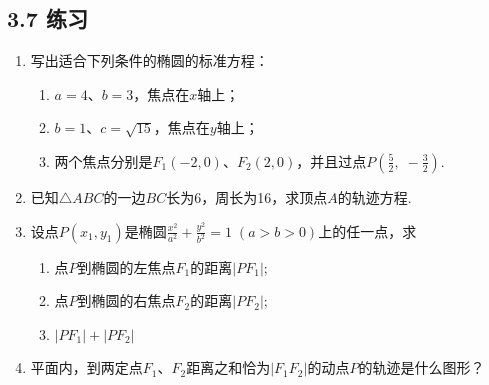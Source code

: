 \subsection*{3.7 练习}
\begin{enumerate}
    \item 写出适合下列条件的椭圆的标准方程：
\begin{enumerate}[(1)]
\item $a=4$、$b=3$，焦点在$x$轴上；
\item $b=1$、$c=\sqrt{15}$，焦点在$y$轴上；
\item 两个焦点分别是$F_1(-2,0)$、$F_2(2,0)$，并且过点$P\left(\frac{5}{2},\; -\frac{3}{2}\right)$.
\end{enumerate}

\item 已知$\triangle ABC$的一边$BC$长为6，周长为16，求顶点$A$的轨迹方程.
\item 设点$P(x_1,y_1)$是椭圆$\frac{x^2}{a^2}+\frac{y^2}{b^2}=1\; (a>b>0)$上的任一点，求
\begin{enumerate}[(1)]
\item 点$P$到椭圆的左焦点$F_1$的距离$|PF_1|$;
\item 点$P$到椭圆的右焦点$F_2$的距离$|PF_2|$;
\item $|PF_1|+|PF_2|$
\end{enumerate}

\item 平面内，到两定点$F_1$、$F_2$距离之和恰为$|F_1F_2|$的动点$P$的轨迹是什么图形？
\end{enumerate}



